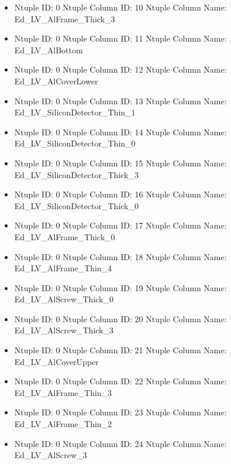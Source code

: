 \documentclass[8pt]{beamer}
\begin{document}
\begin{frame}
\begin{itemize}
        \item Ntuple ID: 0 Ntuple Column ID: 10 Ntuple Column Name: Ed\_LV\_AlFrame\_Thick\_3
        
        \item Ntuple ID: 0 Ntuple Column ID: 11 Ntuple Column Name: Ed\_LV\_AlBottom
        
        \item Ntuple ID: 0 Ntuple Column ID: 12 Ntuple Column Name: Ed\_LV\_AlCoverLower
        
        \item Ntuple ID: 0 Ntuple Column ID: 13 Ntuple Column Name: Ed\_LV\_SiliconDetector\_Thin\_1
        
        \item Ntuple ID: 0 Ntuple Column ID: 14 Ntuple Column Name: Ed\_LV\_SiliconDetector\_Thin\_0
        
        \item Ntuple ID: 0 Ntuple Column ID: 15 Ntuple Column Name: Ed\_LV\_SiliconDetector\_Thick\_3
        
        \item Ntuple ID: 0 Ntuple Column ID: 16 Ntuple Column Name: Ed\_LV\_SiliconDetector\_Thick\_0
        
        \item Ntuple ID: 0 Ntuple Column ID: 17 Ntuple Column Name: Ed\_LV\_AlFrame\_Thick\_0
        
        \item Ntuple ID: 0 Ntuple Column ID: 18 Ntuple Column Name: Ed\_LV\_AlFrame\_Thin\_4
        
        \item Ntuple ID: 0 Ntuple Column ID: 19 Ntuple Column Name: Ed\_LV\_AlScrew\_Thick\_0
        
        \item Ntuple ID: 0 Ntuple Column ID: 20 Ntuple Column Name: Ed\_LV\_AlScrew\_Thick\_3
        
        \item Ntuple ID: 0 Ntuple Column ID: 21 Ntuple Column Name: Ed\_LV\_AlCoverUpper
        
        \item Ntuple ID: 0 Ntuple Column ID: 22 Ntuple Column Name: Ed\_LV\_AlFrame\_Thin\_3
        
        \item Ntuple ID: 0 Ntuple Column ID: 23 Ntuple Column Name: Ed\_LV\_AlFrame\_Thin\_2
        
        \item Ntuple ID: 0 Ntuple Column ID: 24 Ntuple Column Name: Ed\_LV\_AlScrew\_3
        

\end{itemize}
\end{frame}
\end{document}
